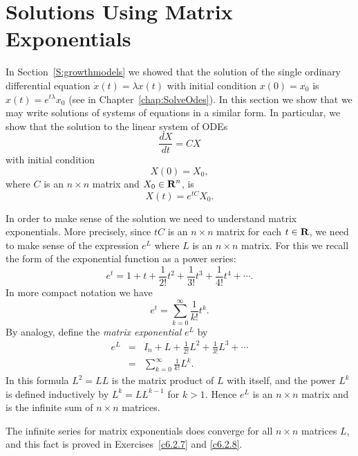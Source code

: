 \documentclass{ximera}
\begin{document}
\section{Solutions Using Matrix Exponentials}
\label{S:Matrixexp} 

In Section~\ref{S:growthmodels} we showed that the solution of the single
ordinary differential equation $\dot x(t) = \lambda x(t)$ with initial
condition $x(0)=x_0$ is $x(t) = e^{t\lambda}x_0$ (see  in
Chapter~\ref{chap:SolveOdes}).  In this section we show that we
may write solutions of systems of equations in a similar form.
In particular, we show that the solution to the linear system of ODEs
\begin{equation}   \label{eq:x=Mx}
\frac{dX}{dt} = CX
\end{equation}
with initial condition
\[
X(0) = X_0,
\]
where $C$ is an $n\times n$ matrix and $X_0\in\mbox{$\bf{R}$}^n$, is
\begin{equation}  \label{matrixsoln}
X(t) = e^{tC}X_0.
\end{equation}

In order to make sense of the solution  we need
to understand matrix exponentials. More precisely, since $tC$ is
an $n\times n$ matrix for each $t\in\mbox{$\bf{R}$}$, we need to make sense
of the expression $e^L$ where $L$ is an $n\times n$ matrix.  For
this we recall the form of the exponential function as a power
series:
\[
     e^t = 1 + t + \frac{1}{2!} t^2 + \frac{1}{3!} t^3
     + \frac{1}{4!} t^4 + \cdots .
\]
In more compact notation we have
\[
     e^t = \sum\limits_{k=0}^\infty \frac{1}{k!} t^k.
\]
By analogy, define the {\em matrix exponential\/}
$e^L$ by
\begin{eqnarray}
e^{L} & = & I_n + L + \frac{1}{2!} L^2 + \frac{1}{3!} L^3 +\cdots
\label{e:expL}\\
      & = & \sum\limits_{k=0}^\infty\frac{1}{k!} L^k. \nonumber
\end{eqnarray}
In this formula $L^2 = LL$ is the matrix product of $L$ with itself, and the
power $L^k$ is defined inductively by $L^k = LL^{k-1}$ for $k>1$.  Hence
$e^L$ is an $n\times n$ matrix and is the infinite sum of $n\times n$
matrices.

   The infinite series for matrix exponentials
 does converge for all $n\times n$ matrices $L$, and this fact
is proved in Exercises~\ref{c6.2.7} and \ref{c6.2.8}.
\end{document}
